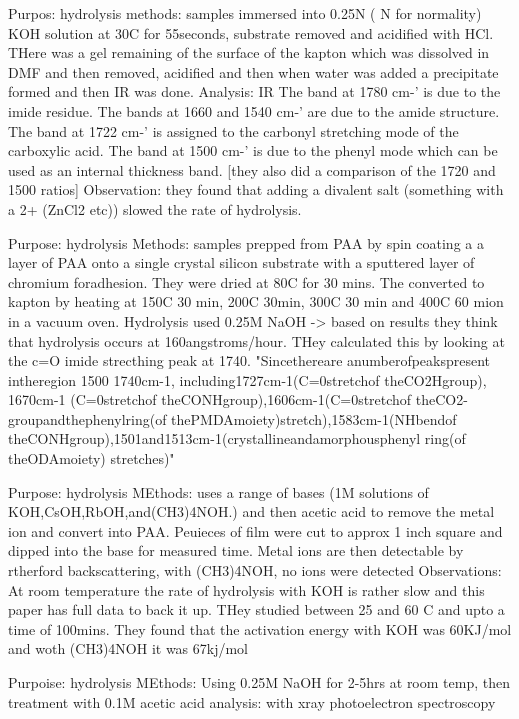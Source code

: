 \cite{xue1986studies}
Purpos: hydrolysis
methods: samples immersed into 0.25N ( N for normality) KOH solution at 30C for 55seconds, substrate removed and acidified with HCl. THere was a gel remaining of the surface of the kapton which was dissolved in DMF and then removed, acidified and then when water was added a precipitate formed and then IR was done.
Analysis: IR The band at 1780 cm-' is due to the imide residue. The bands at 1660 and 1540 cm-' are due to the amide structure. The band at 1722 cm-' is assigned to the carbonyl stretching mode of the carboxylic acid. The band at 1500 cm-' is due to the phenyl mode which can be used as an internal thickness band. [they also did a comparison of the 1720 and 1500 ratios]
Observation: they found that adding a divalent salt (something with a 2+ (ZnCl2 etc)) slowed the rate of hydrolysis.

\cite{thomas1992organic}
Purpose: hydrolysis
Methods: samples prepped from PAA by spin coating a a layer of PAA onto a single crystal silicon substrate with a sputtered layer of chromium foradhesion. They were dried at 80C for 30 mins. The converted to kapton by heating at 150C 30 min, 200C 30min, 300C 30 min and 400C 60 mion in a vacuum oven. Hydrolysis used 0.25M NaOH -> based on results they think that hydrolysis occurs at 160angstroms/hour. THey calculated this by looking at the c=O imide strecthing peak at 1740. "Sincethereare anumberofpeakspresent intheregion 1500 1740cm-1, including1727cm-1(C=0stretchof theCO2Hgroup), 1670cm-1 (C=0stretchof theCONHgroup),1606cm-1(C=0stretchof theCO2-groupandthephenylring(of thePMDAmoiety)stretch),1583cm-1(NHbendof theCONHgroup),1501and1513cm-1(crystallineandamorphousphenyl ring(of theODAmoiety) stretches)"

\cite{stoffel1996surface}
Purpose: hydrolysis
MEthods: uses a range of bases (1M solutions of KOH,CsOH,RbOH,and(CH3)4NOH.) and then acetic acid to remove the metal ion and convert into PAA. Peuieces of film were cut to approx 1 inch square and dipped into the base for measured time. Metal ions are then detectable by rtherford backscattering, with (CH3)4NOH, no ions were detected
Observations: At room temperature the rate of hydrolysis with KOH is rather slow and this paper has full data to back it up. THey studied between 25 and 60 C and upto a time of 100mins. They found that the activation energy with KOH was 60KJ/mol and woth (CH3)4NOH it was 67kj/mol

\cite{plechaty1992chemical}
Purpoise: hydrolysis
MEthods: Using 0.25M NaOH for 2-5hrs at room temp, then treatment with 0.1M acetic acid
analysis: with xray photoelectron spectroscopy

